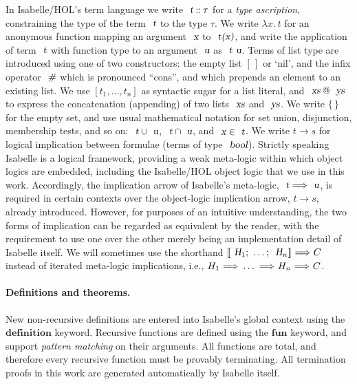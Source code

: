 In Isabelle/HOL's term language we write $\isa{t} \mathbin{::} \tau$ for a \emph{type ascription}, constraining the type of the term $\isa{t}$ to the type $\tau$.
We write $\lambda{x}.\: t$ for an anonymous function mapping an argument $\isa{x}$ to $\isa{t(x)}$, and write the application of term $\isa{t}$ with function type to an argument $\isa{u}$ as $\isa{t\ u}$.
Terms of list type are introduced using one of two constructors: the empty list $[\,]$ or `nil', and the infix operator $\isa{\#}$ which is pronounced ``cons'', and which prepends an element to an existing list.
We use $[t_1, \ldots, t_n]$ as syntactic sugar for a list literal, and $\isa{xs} \mathbin{\isacharat} \isa{ys}$ to express the concatenation (appending) of two lists $\isa{xs}$ and $\isa{ys}$.
We write $\{\,\}$ for the empty set, and use usual mathematical notation for set union, disjunction, membership tests, and so on: $\isa{t} \cup \isa{u}$, $\isa{t} \cap \isa{u}$, and $\isa{x} \in \isa{t}$.
We write $t \longrightarrow s$ for logical implication between formulae (terms of type $\isa{bool}$).
Strictly speaking Isabelle is a logical framework, providing a weak meta-logic within which object logics are embedded, including the Isabelle/HOL object logic that we use in this work.
Accordingly, the implication arrow of Isabelle's meta-logic, $\isa{t} \Longrightarrow \isa{u}$, is required in certain contexts over the object-logic implication arrow, $t \longrightarrow s$, already introduced.
However, for purposes of an intuitive understanding, the two forms of implication can be regarded as equivalent by the reader, with the requirement to use one over the other merely being an implementation detail of Isabelle itself.
We will sometimes use the shorthand ${\isasymlbrakk}\isa{H}_1{\isacharsemicolon}\ \ldots{\isacharsemicolon}\ \isa{H}_n{\isasymrbrakk}\ {\isasymLongrightarrow}\ C$ instead of iterated meta-logic implications, i.e., $H_1\ {\isasymLongrightarrow}\ \ldots\ {\isasymLongrightarrow}\ H_n\ {\isasymLongrightarrow}\ C$.

\paragraph{Definitions and theorems.}

New non-recursive definitions are entered into Isabelle's global context using the $\mathbf{definition}$ keyword.
Recursive functions are defined using the $\mathbf{fun}$ keyword, and support \emph{pattern matching} on their arguments.
All functions are total, and therefore every recursive function must be provably terminating.
All termination proofs in this work are generated automatically by Isabelle itself.

